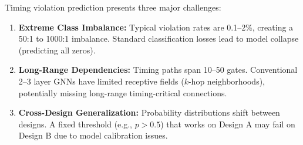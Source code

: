 \documentclass[10pt,twocolumn,journal]{IEEEtran}
\begin{document}
Timing violation prediction presents three major challenges:
\begin{enumerate}
    \item \textbf{Extreme Class Imbalance:} Typical violation rates are 0.1--2\%, creating a 50:1 to 1000:1 imbalance. Standard classification losses lead to model collapse (predicting all zeros).
    
    \item \textbf{Long-Range Dependencies:} Timing paths span 10--50 gates. Conventional 2--3 layer GNNs have limited receptive fields ($k$-hop neighborhoods), potentially missing long-range timing-critical connections.
    
    \item \textbf{Cross-Design Generalization:} Probability distributions shift between designs. A fixed threshold (e.g., $p > 0.5$) that works on Design A may fail on Design B due to model calibration issues.
\end{enumerate}

\end{document}
